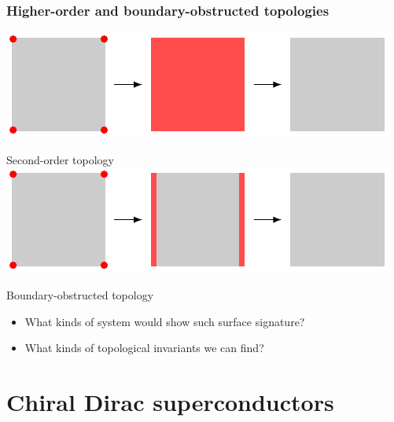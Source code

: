\documentclass{beamer}
\renewcommand{\(}{\left(}
\renewcommand{\)}{\right)}
\renewcommand{\[}{\left[}
\renewcommand{\]}{\right]}
\begin{document}
\begin{frame}
    \frametitle{Higher-order and boundary-obstructed topologies}
    \centering 
    \includegraphics[]{seond_order_boudary.pdf}

    \vspace{5pt}
    Second-order topology 
    \vfill
    \includegraphics[]{boundary_obstructed.pdf}

    \vspace{5pt}
    Boundary-obstructed topology

    \begin{itemize}
        \item What kinds of system would show such surface signature?
        \item What kinds of topological invariants we can find?
    \end{itemize}

\end{frame}



\section{Chiral Dirac superconductors}
\end{document}

